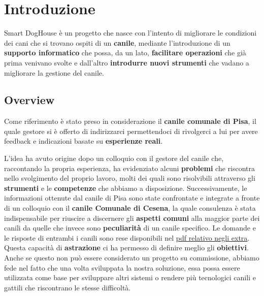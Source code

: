 

\chapter{Introduzione}
Smart DogHouse è un progetto che nasce con l'intento di migliorare le condizioni dei cani che si trovano ospiti di un \textbf{canile}, mediante l'introduzione di un \textbf{supporto informatico} che possa, da un lato, \textbf{facilitare operazioni} che già prima venivano svolte e dall'altro \textbf{introdurre nuovi strumenti} che vadano a migliorare la gestione del canile.

\section{Overview}
Come riferimento è stato preso in considerazione il \textbf{ canile comunale di Pisa}, il quale gestore si è offerto di indirizzarci permettendoci di rivolgerci a lui per avere feedback e indicazioni basate su \textbf{esperienze reali}. 

L'idea ha avuto origine dopo un colloquio con il gestore del canile che, raccontando la propria esperienza, ha evidenziato alcuni \textbf{problemi} che riscontra nello svolgimento del proprio lavoro, molti dei quali sono risolvibili attraverso gli \textbf{strumenti} e le \textbf{competenze} che abbiamo a disposizione.
Successivamente, le informazioni ottenute dal canile di Pisa sono state confrontate e integrate a fronte di un colloquio con il \textbf{canile Comunale di Cesena}, la quale consulenza è stata indispensabile per riuscire a discernere gli \textbf{aspetti comuni }alla maggior parte dei canili da quelle che invece sono \textbf{peculiarità} di un canile specifico. 
Le domande e le risposte di entrambi i canili sono rese disponibili nel \href{https://github.com/SmartDogHouse/Report/tree/main/Extra/Domande_Canile.pdf}{pdf relativo negli extra}.
Questa capacità di \textbf{astrazione} ci ha permesso di definire meglio gli \textbf{obiettivi}. 
Anche se questo non può essere considerato un progetto su commissione, abbiamo fede nel fatto che una volta sviluppata la nostra soluzione, essa possa essere utilizzata come base per sviluppare altri sistemi o rendere più tecnologici canili e gattili che riscontrano le stesse difficoltà.

